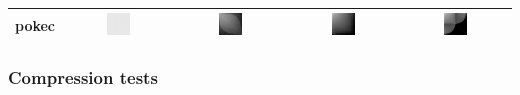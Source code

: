 \documentclass{article}
\begin{document}
\begin{table}[h]
\begin{tabular}{l | c c c c}
\hline
pokec
&
    \includegraphics[width=0.23\textwidth]{../img/pokec/adjacency-matrix-random-ordering.png}
& 
    \includegraphics[width=0.23\textwidth]{../img/pokec/adjacency-matrix-given-ordering.png}
& 
    \includegraphics[width=0.23\textwidth]{../img/pokec/adjacency-matrix-degree-ordering.png}
& 
    \includegraphics[width=0.23\textwidth]{../img/pokec/adjacency-matrix-slashburn-ordering.png} \\


\hline 

\end{tabular}
\end{table}

\subsubsection*{Compression tests}
\end{document}
